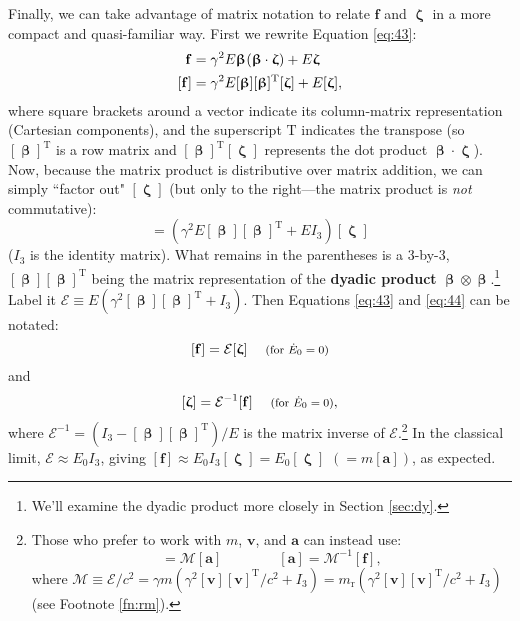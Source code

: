 \documentclass[12pt]{article}
\renewcommand{\vv}[1]{\mathbf{#1}}
\newcommand{\vvbeta}{\bm{\upbeta}}
\newcommand{\vvzeta}{\bm{\upzeta}}
\begin{document}
Finally, we can take advantage of matrix notation to relate $\vv f$ and $\vvzeta$ in a more compact and quasi-familiar way. First we rewrite Equation \ref{eq:43}:
\begin{equation*}
\begin{split}
\vv f &= \gamma^2 E \vvbeta \mkern1mu (\vvbeta \cdot \vvzeta) + E \vvzeta \\
[\vv f] &= \gamma^2 E [\vvbeta] [\vvbeta]^{\mathrm{T}} [\vvzeta] + E [\vvzeta] ,
\end{split}
\end{equation*}
where square brackets around a vector indicate its column-matrix representation (Cartesian components), and the superscript $\mathrm{T}$ indicates the transpose (so $[\vvbeta]^{\mathrm{T}}$ is a row matrix and $[\vvbeta]^{\mathrm{T}} [\vvzeta]$ represents the dot product $\vvbeta \cdot \vvzeta$). Now, because the matrix product is distributive over matrix addition, we can simply ``factor out" $[\vvzeta]$ (but only to the right---the matrix product is \emph{not} commutative):
\begin{equation*}
[\vv f] = (\gamma^2 E [\vvbeta] [\vvbeta]^{\mathrm{T}} + E I_3) [\vvzeta]
\end{equation*}
($I_3$ is the identity matrix). What remains in the parentheses is a 3-by-3, $[\vvbeta] [\vvbeta]^{\mathrm{T}}$ being the matrix representation of the \textbf{dyadic product} $\vvbeta \otimes \vvbeta$.\footnote{We'll examine the dyadic product more closely in Section \ref{sec:dy}.} Label it $\mathcal{E} \equiv E(\gamma^2 [\vvbeta] [\vvbeta]^{\mathrm{T}} + I_3)$. Then Equations \ref{eq:43} and \ref{eq:44} can be notated:
\begin{equation}\label{eq:48}
[\vv f] = \mathcal{E} [\vvzeta] \quad \textrm{\footnotesize{ (for $\dot{E}_0 = 0$)}}
\end{equation}
and
\begin{equation}\label{eq:49}
[\vvzeta] = \mathcal{E}^{-1} [\vv f] \quad \textrm{\footnotesize{ (for $\dot{E}_0 = 0$)}},
\end{equation}
where $\mathcal{E}^{-1} = (I_3 - [\vvbeta] [\vvbeta]^{\mathrm{T}})/E$ is the matrix inverse of $\mathcal{E}$.\footnote{Those who prefer to work with $m$, $\vv v$, and $\vv a$ can instead use:
\begin{equation*}
[\vv f] = \mathcal{M} [\vv a] \qquad \qquad [\vv a] = \mathcal{M}^{-1} [\vv f],
\end{equation*}
where $\mathcal{M} \equiv \mathcal{E} / c^2 = \gamma m (\gamma^2 [\vv v] [\vv v]^{\mathrm{T}}/c^2 + I_3) =  m_{\textrm{r}}(\gamma^2 [\vv v] [\vv v]^{\mathrm{T}}/c^2 + I_3)$ (see Footnote \ref{fn:rm}).} In the classical limit, $\mathcal{E} \approx E_0 I_3$, giving $[\vv f] \approx E_0 I_3 [\vvzeta] = E_0 [\vvzeta]$ $(= m [\vv a])$, as expected.
\end{document}
